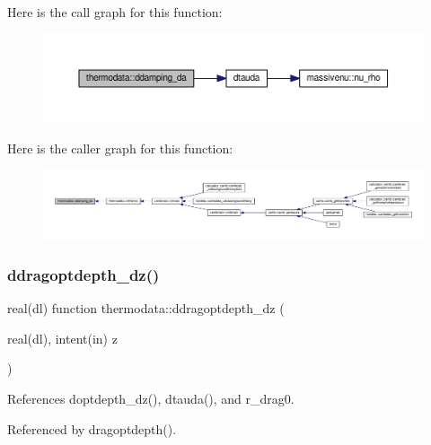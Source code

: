 Here is the call graph for this function\+:
\nopagebreak
\begin{figure}[H]
\begin{center}
\leavevmode
\includegraphics[width=350pt]{namespacethermodata_a78b5c4ff5e2d2d472df5aae9bdd02d77_cgraph}
\end{center}
\end{figure}
Here is the caller graph for this function\+:
\nopagebreak
\begin{figure}[H]
\begin{center}
\leavevmode
\includegraphics[width=350pt]{namespacethermodata_a78b5c4ff5e2d2d472df5aae9bdd02d77_icgraph}
\end{center}
\end{figure}
\mbox{\label{namespacethermodata_a3d2fe3077a350ae407ecb93f927b2cc4}} 
\subsubsection{\texorpdfstring{ddragoptdepth\+\_\+dz()}{ddragoptdepth\_dz()}}
{\footnotesize\ttfamily real(dl) function thermodata\+::ddragoptdepth\+\_\+dz (\begin{DoxyParamCaption}\item[{real(dl), intent(in)}]{z }\end{DoxyParamCaption})\hspace{0.3cm}{\ttfamily [private]}}



References doptdepth\+\_\+dz(), dtauda(), and r\+\_\+drag0.



Referenced by dragoptdepth().

